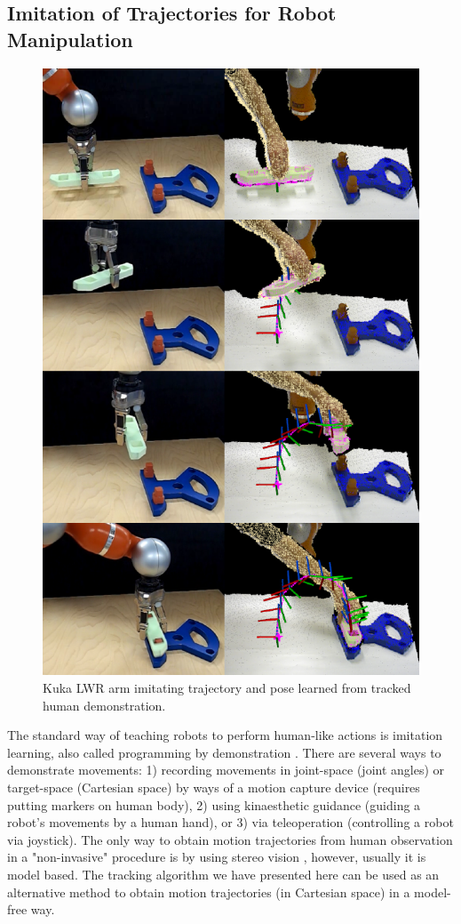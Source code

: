 \subsection{Imitation of Trajectories for Robot Manipulation}
\begin{figure}[!tb]
  \centering
  \includegraphics[scale=0.84]{figures/IROS2013/RobotImitation.pdf}
  \caption[Trajectory Imitation]{Kuka LWR arm imitating trajectory and pose learned from tracked human demonstration.}
  \label{fig:Imitation}
\end{figure}
The standard way of teaching robots to perform human-like actions is imitation learning, also called programming by demonstration \cite{Billard2008,Argall2009}. There are several ways to demonstrate movements: 1) recording movements in joint-space (joint angles) or target-space (Cartesian space) by ways of a motion capture device (requires putting markers on human body), 2) using kinaesthetic guidance (guiding a robot's movements by a human hand), or 3) via teleoperation (controlling a robot via joystick). The only way to obtain motion trajectories from human observation in a "non-invasive" procedure is by using stereo vision \cite{Hecht2009}, however, usually it is model based. The tracking algorithm we have presented here can be used as an alternative method to obtain motion trajectories (in Cartesian space) in a model-free way. 

